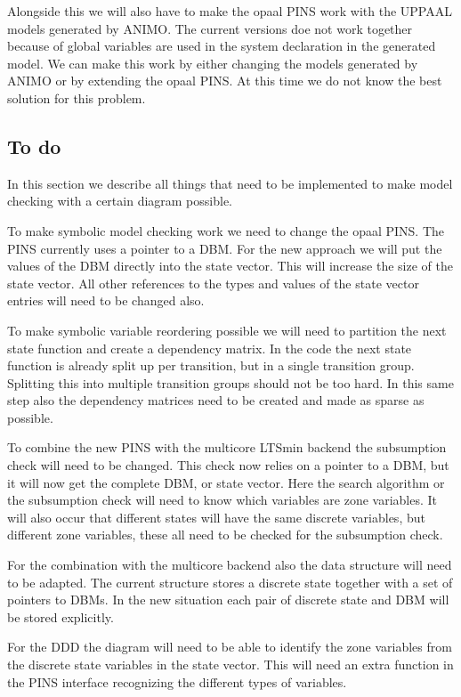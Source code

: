 \documentclass[11pt]{article}
\begin{document}
Alongside this we will also have to make the opaal PINS work with the UPPAAL models generated by ANIMO. The current versions doe not work together because of global variables are used in the system declaration in the generated model. We can make this work by either changing the models generated by ANIMO or by extending the opaal PINS. At this time we do not know the best solution for this problem.

\subsection{To do}
In this section we describe all things that need to be implemented to make model checking with a certain diagram possible. 

To make symbolic model checking work we need to change the opaal PINS. The PINS currently uses a pointer to a DBM. For the new approach we will put the values of the DBM directly into the state vector. This will increase the size of the state vector. All other references to the types and values of the state vector entries will need to be changed also. 

To make symbolic variable reordering possible we will need to partition the next state function and create a dependency matrix. In the code the next state function is already split up per transition, but in a single transition group. Splitting this into multiple transition groups should not be too hard. In this same step also the dependency matrices need to be created and made as sparse as possible.

To combine the new PINS with the multicore LTSmin backend the subsumption check will need to be changed. This check now relies on a pointer to a DBM, but it will now get the complete DBM, or state vector. Here the search algorithm or the subsumption check will need to know which variables are zone variables. It will also occur that different states will have the same discrete variables, but different zone variables, these all need to be checked for the subsumption check.

For the combination with the multicore backend also the data structure will need to be adapted. The current structure stores a discrete state together with a set of pointers to DBMs. In the new situation each pair of discrete state and DBM will be stored explicitly.

For the DDD the diagram will need to be able to identify the zone variables from the discrete state variables in the state vector. This will need an extra function in the PINS interface recognizing the different types of variables.  
\end{document}
